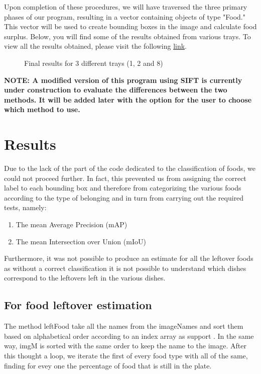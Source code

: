 \documentclass[
	a4paper, %
	10pt, %
	unnumberedsections, %
	twoside, %
]{LTJournalArticle}
\begin{document}
Upon completion of these procedures, we will have traversed the three primary phases of our program, resulting in a vector containing objects of type "Food." This vector will be used to create bounding boxes in the image and calculate food surplus. Below, you will find some of the results obtained from various trays. To view all the results obtained, please visit the following \href{https://github.com/Piero24/Food-recognition-and-leftover-estimation}{link}.

\begin{figure}[t]
    \centering
    \caption{Final results for 3 different trays (1, 2 and 8)}
    \label{fig:Final3trays}
\end{figure}

\textbf{NOTE: A modified version of this program using SIFT is currently under construction to evaluate the differences between the two methods. It will be added later with the option for the user to choose which method to use.}
















\section{Results}
Due to the lack of the part of the code dedicated to the classification of foods, we could not proceed further.
In fact, this prevented us from assigning the correct label to each bounding box and therefore from categorizing the various foods according to the type of belonging and in turn from carrying out the required tests, namely:
\begin{enumerate}
	\item The mean Average Precision (mAP)
	\item The  mean  Intersection  over  Union  (mIoU)
\end{enumerate}

Furthermore, it was not possible to produce an estimate for all the leftover foods as without a correct classification it is not possible to understand which dishes correspond to the leftovers left in the various dishes.

\subsection{For food leftover estimation}
The method leftFood take all the names from the imageNames and sort them based on alphabetical order according to an index array as support . In the same way, imgM is sorted with the same order to keep the name to the image. After this thought a loop, we iterate the first of every food type with all of the same, finding for evey one the percentage of food that is still in the plate.
\end{document}
